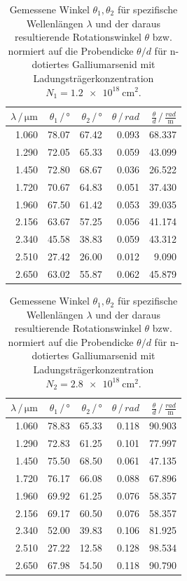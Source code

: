 \begin{table}
    \centering
    \caption{Gemessene Winkel $\theta_1, \theta_2$ für spezifische Wellenlängen $\lambda$ und der daraus resultierende Rotationswinkel $\theta$ bzw. normiert auf die Probendicke $\theta/d$ für n-dotiertes Galliumarsenid mit Ladungsträgerkonzentration $N_1 = \qty{1.2e18}{\centi\metre^2}$.}
    \label{tab:N1}
    \begin{tabular}{r r r r r}
        \toprule
        $\lambda \,/\, \unit{\micro\metre}$ & $\theta_1 \,/\, \unit{\degree}$ & $\theta_2 \,/\, \unit{\degree}$ & $\theta \,/\, \unit{rad}$ & $\frac{\theta}{d} \,/\, \frac{rad}{\unit{\metre}}$ \\
        \midrule
        1.060 & 78.07 & 67.42 & 0.093 & 68.337 \\
        1.290 & 72.05 & 65.33 & 0.059 & 43.099 \\
        1.450 & 72.80 & 68.67 & 0.036 & 26.522 \\
        1.720 & 70.67 & 64.83 & 0.051 & 37.430 \\
        1.960 & 67.50 & 61.42 & 0.053 & 39.035 \\
        2.156 & 63.67 & 57.25 & 0.056 & 41.174 \\
        2.340 & 45.58 & 38.83 & 0.059 & 43.312 \\
        2.510 & 27.42 & 26.00 & 0.012 & 9.090 \\
        2.650 & 63.02 & 55.87 & 0.062 & 45.879 \\
        \bottomrule
    \end{tabular}
\end{table}
\begin{table}
    \centering
    \caption{Gemessene Winkel $\theta_1, \theta_2$ für spezifische Wellenlängen $\lambda$ und der daraus resultierende Rotationswinkel $\theta$ bzw. normiert auf die Probendicke $\theta/d$ für n-dotiertes Galliumarsenid mit Ladungsträgerkonzentration $N_2 = \qty{2.8e18}{\centi\metre^2}$.}
    \label{tab:N2}
    \begin{tabular}{r r r r r}
        \toprule
        $\lambda \,/\, \unit{\micro\metre}$ & $\theta_1 \,/\, \unit{\degree}$ & $\theta_2 \,/\, \unit{\degree}$ & $\theta \,/\, \unit{rad}$ & $\frac{\theta}{d} \,/\, \frac{rad}{\unit{\metre}}$ \\
        \midrule
        1.060 & 78.83 & 65.33 & 0.118 & 90.903 \\
        1.290 & 72.83 & 61.25 & 0.101 & 77.997 \\
        1.450 & 75.50 & 68.50 & 0.061 & 47.135 \\
        1.720 & 76.17 & 66.08 & 0.088 & 67.896 \\
        1.960 & 69.92 & 61.25 & 0.076 & 58.357 \\
        2.156 & 69.17 & 60.50 & 0.076 & 58.357 \\
        2.340 & 52.00 & 39.83 & 0.106 & 81.925 \\
        2.510 & 27.22 & 12.58 & 0.128 & 98.534 \\
        2.650 & 67.98 & 54.50 & 0.118 & 90.790 \\      
        \bottomrule
    \end{tabular}
\end{table}
